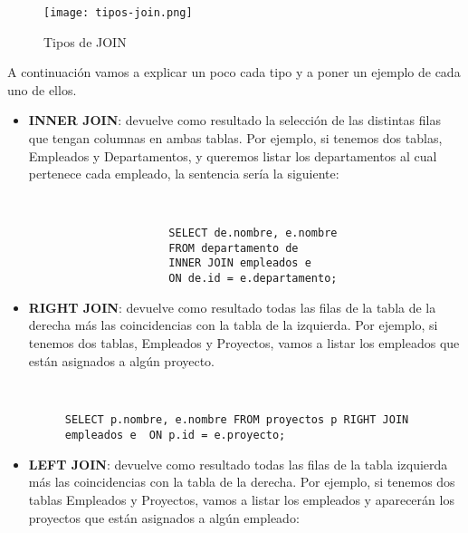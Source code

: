 \begin{figure}[H]
    \centering
    \texttt{[image: tipos-join.png]}
    \caption{Tipos de JOIN}
\end{figure}

A continuación vamos a explicar un poco cada tipo y a poner un ejemplo de cada uno de ellos.

\begin{itemize}
    \item \textbf{INNER JOIN}: devuelve como resultado la selección de las distintas filas que tengan columnas en ambas tablas. Por ejemplo, si tenemos dos tablas, Empleados y Departamentos, y queremos listar los departamentos al cual pertenece cada empleado, la sentencia sería la siguiente:

    \begin{figure}[H]
        \begin{tcolorbox}[sharp corners, colback=yellow!30, colframe=white!20]
            \scriptsize
            \begin{verbatim}


                SELECT de.nombre, e.nombre
                FROM departamento de
                INNER JOIN empleados e
                ON de.id = e.departamento;
            \end{verbatim}
        \end{tcolorbox}
    \end{figure}

    \item \textbf{RIGHT JOIN}: devuelve como resultado todas las filas de la tabla de la derecha más las coincidencias con la tabla de la izquierda. Por ejemplo, si tenemos dos tablas, Empleados y Proyectos, vamos a listar los empleados que están asignados a algún proyecto.

    \begin{figure}[H]
        \begin{tcolorbox}[sharp corners, colback=yellow!30, colframe=white!20]
            \scriptsize
            \begin{verbatim}


SELECT p.nombre, e.nombre FROM proyectos p RIGHT JOIN empleados e  ON p.id = e.proyecto;
            \end{verbatim}
        \end{tcolorbox}
    \end{figure}

    \item \textbf{LEFT JOIN}: devuelve como resultado todas las filas de la tabla izquierda más las coincidencias con la tabla de la derecha. Por ejemplo, si tenemos dos tablas Empleados y Proyectos, vamos a listar los empleados y aparecerán los proyectos que están asignados a algún empleado:


\end{itemize}
